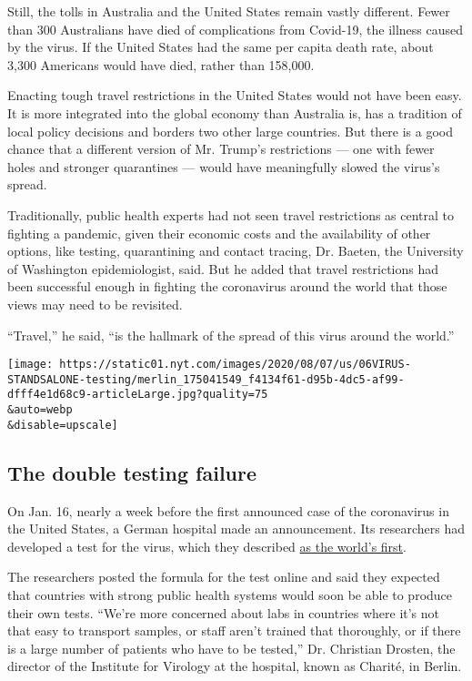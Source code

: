 Still, the tolls in Australia and the United States remain vastly
different. Fewer than 300 Australians have died of complications from
Covid-19, the illness caused by the virus. If the United States had the
same per capita death rate, about 3,300 Americans would have died,
rather than 158,000.

Enacting tough travel restrictions in the United States would not have
been easy. It is more integrated into the global economy than Australia
is, has a tradition of local policy decisions and borders two other
large countries. But there is a good chance that a different version of
Mr. Trump's restrictions --- one with fewer holes and stronger
quarantines --- would have meaningfully slowed the virus's spread.

Traditionally, public health experts had not seen travel restrictions as
central to fighting a pandemic, given their economic costs and the
availability of other options, like testing, quarantining and contact
tracing, Dr. Baeten, the University of Washington epidemiologist, said.
But he added that travel restrictions had been successful enough in
fighting the coronavirus around the world that those views may need to
be revisited.

``Travel,'' he said, ``is the hallmark of the spread of this virus
around the world.''

\texttt{[image: https://static01.nyt.com/images/2020/08/07/us/06VIRUS-STANDSALONE-testing/merlin\_175041549\_f4134f61-d95b-4dc5-af99-dfff4e1d68c9-articleLarge.jpg?quality=75\\\&auto=webp\\\&disable=upscale]}

\hypertarget{the-double-testing-failure}{%
\subsection{The double testing
failure}\label{the-double-testing-failure}}

On Jan. 16, nearly a week before the first announced case of the
coronavirus in the United States, a German hospital made an
announcement. Its researchers had developed a test for the virus, which
they described
\href{https://www.charite.de/en/service/press_reports/artikel/detail/researchers_develop_first_diagnostic_test_for_novel_coronavirus_in_china/}{as
the world's first}.

The researchers posted the formula for the test online and said they
expected that countries with strong public health systems would soon be
able to produce their own tests. ``We're more concerned about labs in
countries where it's not that easy to transport samples, or staff aren't
trained that thoroughly, or if there is a large number of patients who
have to be tested,'' Dr. Christian Drosten, the director of the
Institute for Virology at the hospital, known as Charité, in Berlin.

